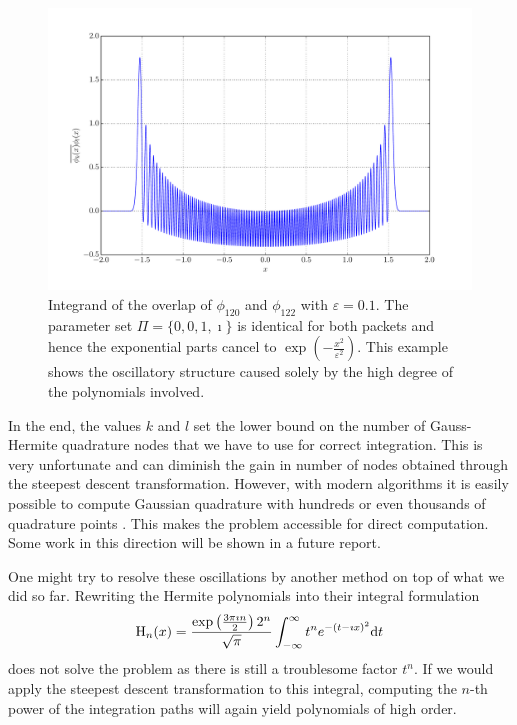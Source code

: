 \documentclass[a4paper,10pt]{article}
\begin{document}
\begin{figure}[h!]
  \centering
  \includegraphics[width=0.8\linewidth]{./fig/poly_oscillations.pdf}
  \caption{Integrand of the overlap of $\phi_{120}$ and $\phi_{122}$
  with $\varepsilon=0.1$. The parameter set $\Pi = \{0,0,1,\imath\}$
  is identical for both packets and hence the exponential parts cancel
  to $\exp(-\frac{x^2}{\varepsilon^2})$. This example shows the oscillatory
  structure caused solely by the high degree of the polynomials involved.}
  \label{fig:polynomials_oscillations}
\end{figure}

In the end, the values $k$ and $l$ set the lower bound on the number of Gauss-Hermite
quadrature nodes that we have to use for correct integration. This is very unfortunate
and can diminish the gain in number of nodes obtained through the steepest descent
transformation. However, with modern algorithms it is easily possible to compute
Gaussian quadrature with hundreds or even thousands of quadrature points \cite{GLR,TTS}.
This makes the problem accessible for direct computation. Some work in this direction
will be shown in a future report.

One might try to resolve these oscillations by another method on top
of what we did so far. Rewriting the Hermite polynomials into their integral formulation
\begin{equation*}
  \operatorname{H}_n(x) =
  \frac{\exp\left(\frac{3\pi \imath n}{2}\right) 2^n}{\sqrt{\pi}}
  \int_{-\infty}^{\infty} t^n e^{-(t - \imath x)^2} \mathrm{d}t
\end{equation*}
does not solve the problem as there is still a troublesome factor $t^n$.
If we would apply the steepest descent transformation to this integral, computing
the $n$-th power of the integration paths will again yield polynomials of high order.
\end{document}
